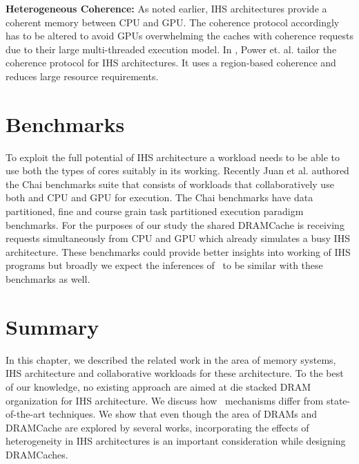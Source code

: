 \par \textbf{Heterogeneous Coherence:} As noted earlier, IHS architectures provide a coherent memory between CPU and GPU. The coherence protocol accordingly has to be altered to avoid GPUs overwhelming the caches with coherence requests due to their large multi-threaded execution model. In \cite{hsc-coherence}, Power et. al. tailor the coherence protocol for IHS architectures. It uses a region-based coherence and reduces large resource requirements.

\section{Benchmarks}
To exploit the full potential of IHS architecture a workload needs to be able to use both the types of cores suitably in its working. Recently Juan et al. authored the Chai benchmarks suite \cite{chai} that consists of workloads that collaboratively use both and CPU and GPU for execution. The Chai benchmarks have data partitioned, fine and course grain task partitioned execution paradigm benchmarks. For the purposes of our study the shared DRAMCache is receiving requests simultaneously from CPU and GPU which already simulates a busy IHS architecture. These benchmarks could provide better insights into working of IHS programs but broadly we expect the inferences of \cachename\ to be similar with these benchmarks as well.

\section{Summary}
In this chapter, we described the related work in the area of memory systems, IHS architecture and collaborative workloads for these architecture. To the best of our knowledge, no existing approach are aimed at die stacked DRAM organization for IHS architecture. We discuss how \cachename\ mechanisms differ from state-of-the-art techniques. We show that even though the area of DRAMs and DRAMCache are explored by several works, incorporating the effects of heterogeneity in IHS architectures is an important consideration while designing DRAMCaches.
